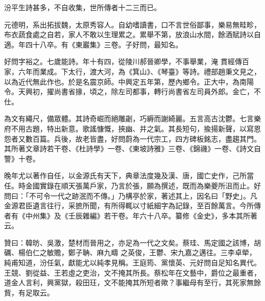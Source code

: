 \begin{pinyinscope}
 汾平生詩甚多，不自收集，世所傳者十二三而已。



 元德明，系出拓拔魏，太原秀容人。自幼嗜讀書，口不言世俗鄙事，樂易無畦畛，布衣蔬食處之自若，家人不敢以生理累之。累舉不第，放浪山水間，餘酒賦詩以自適。年四十八卒。有《東巖集》三卷。子好問，最知名。



 好問字裕之。七歲能詩。年十有四，從陵川郝晉卿學，不事舉業，淹
 貫經傳百家，六年而業成。下太行，渡大河，為《箕山》、《琴臺》等詩。禮部趙秉文見之，以為近代無此作也。於是名震京師。中興定五年第，歷內鄉令。正大中，為南陽令。天興初，擢尚書省掾，頃之，除左司都事，轉行尚書省左司員外郎。金亡，不仕。



 為文有繩尺，備眾體。其詩奇崛而絕雕劌，巧縟而謝綺麗。五言高古沈鬱。七言樂府不用古題，特出新意。歌謠慷慨，挾幽、并之氣。其長短句，揄揚新聲，以寫恩怨者又數百篇。兵後，故老皆盡，好問蔚為一代宗工，四方碑板銘志，盡趨其門。其所著文章詩若干卷、《杜詩學》一卷、《東坡詩雅》三卷、《錦禨》一卷、《詩文自警》十卷。



 晚年尤以著作自任，以金源氏有天下，典章法度幾及漢、唐，國亡史作，己所當任。時金國實錄在順天張萬戶家，乃言於張，願為撰述，既而為樂夔所沮而止。好問曰：「不可令一代之跡泯而不傳。」乃構亭於家，著述其上，因名曰「野史」。凡金源君臣遺言往行，采摭所聞，有所得輒以寸紙細字為記錄，至百餘萬言。今所傳者有《中州集》及《壬辰雜編》若干卷。年六十八卒。纂修《金史》，多本其所著云。



 贊曰：韓昉、吳激，楚材而晉用之，亦足為一代之文矣。蔡珪、馬定國之該博，胡礪、楊伯仁之敏贍，鄭子聃、麻九疇
 之英俊，王鬱、宋九嘉之邁往。三李卓犖，純甫知道，汾任氣，獻能尤以純孝見稱。王庭筠、黨懷英、元好問自足知名異代。王競、劉從益、王若虛之吏治，文不掩其所長。蔡松年在文藝中，爵位之最重者，道金人言利，興黨獄，殺田玨，文不能掩其所短者歟？事繼母有至行，其死家無餘貲，有足取云。



\end{pinyinscope}